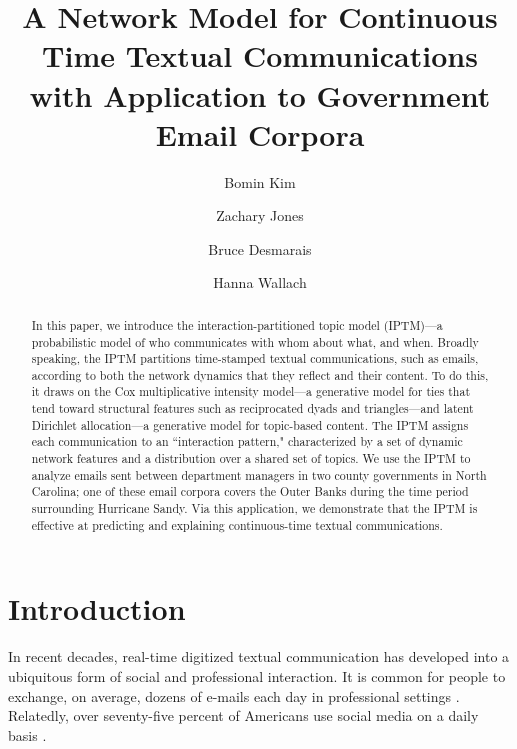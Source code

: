 \documentclass[a4paper]{article}
\title{A Network Model for Continuous Time Textual Communications\\ with Application to Government Email Corpora}
\author[1]{Bomin Kim}
\author[1]{Zachary Jones}
\author[1]{Bruce Desmarais}
\author[2,3]{Hanna Wallach}
\affil[1]{Pennsylvania State University}
\affil[2]{Microsoft Research NYC}
\affil[3]{University of Massachusetts Amherst}
\begin{document}
\maketitle
\begin{abstract}
	
	\noindent In this paper, we introduce the interaction-partitioned topic model
	(IPTM)---a probabilistic model of who communicates with whom about
	what, and when. Broadly speaking, the IPTM partitions time-stamped
	textual communications, such as emails, according to both the network
	dynamics that they reflect and their content. To do this, it draws on
	the Cox multiplicative intensity model---a generative model for ties
	that tend toward structural features such as reciprocated dyads and
	triangles---and latent Dirichlet allocation---a generative model for
	topic-based content. The IPTM assigns each communication to an
	``interaction pattern," characterized by a set of dynamic network
	features and a distribution over a shared set of topics. We use the
	IPTM to analyze emails sent between department managers in two county
	governments in North Carolina; one of these email corpora covers the
	Outer Banks during the time period surrounding Hurricane Sandy. Via
	this application, we demonstrate that the IPTM is effective at
	predicting and explaining continuous-time textual communications.	
\end{abstract}
\section{Introduction} \label{sec: Introduction}

In recent decades, real-time digitized textual communication has developed into a ubiquitous form of social and professional interaction. It is common for people to exchange, on average, dozens of e-mails each day in professional settings \citep[see, e.g.,][]{kanungo2008modeling, szostek2011dealing, burgess2004email}. Relatedly, over seventy-five percent of Americans use social media on a daily basis \citep{pew2016}. 
\end{document}
